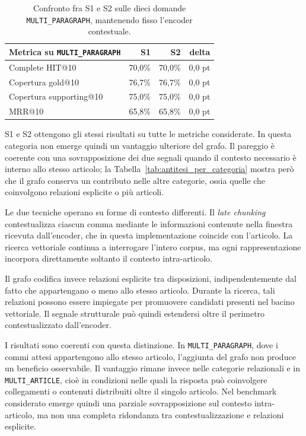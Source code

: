 \begin{table}[H]
    \centering
    \renewcommand{\arraystretch}{1.2}
    \begin{tabular}{|l|r|r|r|}
        \hline
        \textbf{Metrica su \texttt{MULTI\_PARAGRAPH}} & \textbf{S1} & \textbf{S2} & \textbf{delta} \\
        \hline
        Complete HIT@10 & 70,0\% & 70,0\% & 0,0 pt \\
        Copertura gold@10 & 76,7\% & 76,7\% & 0,0 pt \\
        Copertura supporting@10 & 75,0\% & 75,0\% & 0,0 pt \\
        MRR@10 & 65,8\% & 65,8\% & 0,0 pt \\
        \hline
    \end{tabular}
    \caption{Confronto fra S1 e S2 sulle dieci domande \texttt{MULTI\_PARAGRAPH}, mantenendo fisso l'encoder contestuale.}
    \label{tab:multi_paragraph_context}
\end{table}

S1 e S2 ottengono gli stessi risultati su tutte le metriche considerate. In questa categoria non emerge quindi un vantaggio ulteriore del grafo. Il pareggio è coerente con una sovrapposizione dei due segnali quando il contesto necessario è interno allo stesso articolo; la Tabella~\ref{tab:antitesi_per_categoria} mostra però che il grafo conserva un contributo nelle altre categorie, ossia quelle che coinvolgono relazioni esplicite o più articoli.

Le due tecniche operano su forme di contesto differenti. Il \textit{late chunking} contestualizza ciascun comma mediante le informazioni contenute nella finestra ricevuta dall'encoder, che in questa implementazione coincide con l'articolo. La ricerca vettoriale continua a interrogare l'intero corpus, ma ogni rappresentazione incorpora direttamente soltanto il contesto intra-articolo.

Il grafo codifica invece relazioni esplicite tra disposizioni, indipendentemente dal fatto che appartengano o meno allo stesso articolo. Durante la ricerca, tali relazioni possono essere impiegate per promuovere candidati presenti nel bacino vettoriale. Il segnale strutturale può quindi estendersi oltre il perimetro contestualizzato dall'encoder.

I risultati sono coerenti con questa distinzione. In \texttt{MULTI\_PARAGRAPH}, dove i commi attesi appartengono allo stesso articolo, l'aggiunta del grafo non produce un beneficio osservabile. Il vantaggio rimane invece nelle categorie relazionali e in \texttt{MULTI\_ARTICLE}, cioè in condizioni nelle quali la risposta può coinvolgere collegamenti o contenuti distribuiti oltre il singolo articolo. Nel benchmark considerato emerge quindi una parziale sovrapposizione sul contesto intra-articolo, ma non una completa ridondanza tra contestualizzazione e relazioni esplicite.

